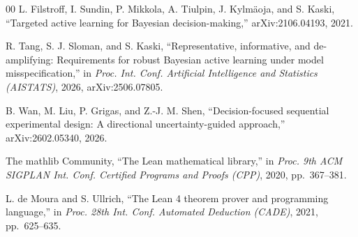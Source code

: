 \begin{thebibliography}{00}
 L. Filstroff, I. Sundin, P. Mikkola, A. Tiulpin, J. Kylm\"{a}oja,
and S. Kaski, ``Targeted active learning for Bayesian decision-making,'' arXiv:2106.04193,
2021.

 R. Tang, S. J. Sloman, and S. Kaski, ``Representative, informative, and
de-amplifying: Requirements for robust Bayesian active learning under model misspecification,''
in \emph{Proc. Int. Conf. Artificial Intelligence and Statistics (AISTATS)}, 2026,
arXiv:2506.07805.

 B. Wan, M. Liu, P. Grigas, and Z.-J. M. Shen, ``Decision-focused
sequential experimental design: A directional uncertainty-guided approach,'' arXiv:2602.05340,
2026.

 The mathlib Community, ``The Lean mathematical library,'' in
\emph{Proc. 9th ACM SIGPLAN Int. Conf. Certified Programs and Proofs (CPP)}, 2020,
pp.~367--381.

 L. de Moura and S. Ullrich, ``The Lean 4 theorem prover and
programming language,'' in \emph{Proc. 28th Int. Conf. Automated Deduction (CADE)}, 2021,
pp.~625--635.

\end{thebibliography}



